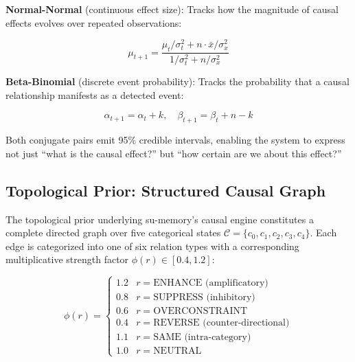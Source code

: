 \documentclass[11pt,a4paper]{article}
\begin{document}
\textbf{Normal-Normal} (continuous effect size): Tracks how the magnitude of causal effects evolves over repeated observations:

\begin{equation}
\mu_{t+1} = \frac{\mu_t/\sigma_t^2 + n \cdot \bar{x}/\sigma_x^2}{1/\sigma_t^2 + n/\sigma_x^2}
\label{eq:normal_normal}
\end{equation}

\textbf{Beta-Binomial} (discrete event probability): Tracks the probability that a causal relationship manifests as a detected event:

\begin{equation}
\alpha_{t+1} = \alpha_t + k, \quad \beta_{t+1} = \beta_t + n - k
\label{eq:beta_binomial}
\end{equation}

Both conjugate pairs emit 95\% credible intervals, enabling the system to express not just ``what is the causal effect?'' but ``how certain are we about this effect?''

\subsection{Topological Prior: Structured Causal Graph}

The topological prior underlying su-memory's causal engine constitutes a complete directed graph over five categorical states \(\mathcal{C} = \{c_0, c_1, c_2, c_3, c_4\}\). Each edge is categorized into one of six relation types with a corresponding multiplicative strength factor \(\phi(r) \in [0.4, 1.2]\):

\begin{equation}
\phi(r) = \begin{cases}
1.2 & r = \text{ENHANCE (amplificatory)} \\
0.8 & r = \text{SUPPRESS (inhibitory)} \\
0.6 & r = \text{OVERCONSTRAINT} \\
0.4 & r = \text{REVERSE (counter-directional)} \\
1.1 & r = \text{SAME (intra-category)} \\
1.0 & r = \text{NEUTRAL}
\end{cases}
\label{eq:phi}
\end{equation}
\end{document}
